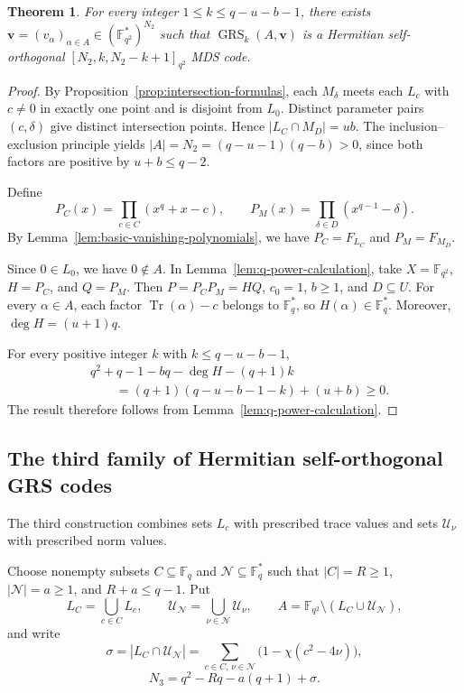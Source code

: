 \documentclass[preprint,12pt,a4paper]{elsarticle}
\newtheorem{theorem}{Theorem}[section]
\newcommand{\Tr}{\operatorname{Tr}}
\newcommand{\GRS}{\operatorname{GRS}}
\begin{document}
\begin{theorem}\label{thm:second-grs}
For every integer $1\le k\le q-u-b-1$, there exists $\boldsymbol v=(v_\alpha)_{\alpha\in A}\in (\mathbb F_{q^2}^{*})^{N_2}$ such that $\GRS_k(A,\boldsymbol v)$ is a Hermitian self-orthogonal $[N_2,k,N_2-k+1]_{q^2}$ MDS code.
\end{theorem}

\begin{proof}
By Proposition~\ref{prop:intersection-formulas}, each $M_\delta$ meets each $L_c$ with $c\ne0$ in exactly one point and is disjoint from $L_0$. Distinct parameter pairs $(c,\delta)$ give distinct intersection points. Hence $|L_C\cap M_D|=ub$. The inclusion--exclusion principle yields $|A|=N_2=(q-u-1)(q-b)>0$, since both factors are positive by $u+b\le q-2$.

Define
\[
 P_C(x)=\prod_{c\in C}(x^q+x-c),
 \qquad
 P_M(x)=\prod_{\delta\in D}(x^{q-1}-\delta).
\]
By Lemma~\ref{lem:basic-vanishing-polynomials}, we have $P_C=F_{L_C}$ and $P_M=F_{M_D}$.

Since $0\in L_0$, we have $0\notin A$. In Lemma~\ref{lem:q-power-calculation}, take $X=\mathbb F_{q^2}$, $H=P_C$, and $Q=P_M$. Then $P=P_CP_M=HQ$, $c_0=1$, $b\ge1$, and $D\subseteq U$. For every $\alpha\in A$, each factor $\Tr(\alpha)-c$ belongs to $\mathbb F_q^{*}$, so $H(\alpha)\in\mathbb F_q^{*}$. Moreover, $\deg H=(u+1)q$.

For every positive integer $k$ with $k\le q-u-b-1$,
\[
\begin{aligned}
 &q^2+q-1-bq-\deg H-(q+1)k\\
 &\qquad=(q+1)(q-u-b-1-k)+(u+b)\ge0.
\end{aligned}
\]
The result therefore follows from Lemma~\ref{lem:q-power-calculation}.
\end{proof}

\subsection{The third family of Hermitian self-orthogonal GRS codes}

The third construction combines sets $L_c$ with prescribed trace values and sets $\mathcal U_\nu$ with prescribed norm values.

Choose nonempty subsets $C\subseteq\mathbb F_q$ and $\mathcal N\subseteq\mathbb F_q^{*}$ such that $|C|=R\ge1$, $|\mathcal N|=a\ge1$, and $R+a\le q-1$. Put
\[
 L_C=\bigcup_{c\in C}L_c,
 \qquad
 \mathcal U_{\mathcal N}=\bigcup_{\nu\in\mathcal N}\mathcal U_\nu,
 \qquad
 A=\mathbb F_{q^2}\setminus(L_C\cup\mathcal U_{\mathcal N}),
\]
and write
\[
 \sigma=|L_C\cap\mathcal U_{\mathcal N}|
 =\sum_{c\in C,\,\nu\in\mathcal N}
 \bigl(1-\chi(c^2-4\nu)\bigr),
\]
\[
 N_3=q^2-Rq-a(q+1)+\sigma.
\]
\end{document}
